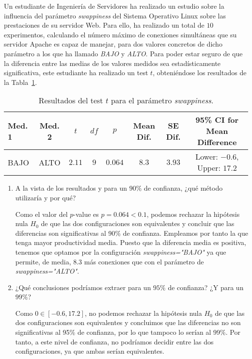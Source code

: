 \begin{ejercicio}\label{ej:4.18}
Un estudiante de Ingeniería de Servidores ha realizado un estudio sobre la influencia del parámetro \emph{swappiness} del Sistema Operativo Linux sobre las prestaciones de su servidor Web. Para ello, ha realizado un total de $10$ experimentos, calculando el número máximo de conexiones simultáneas que su servidor Apache es capaz de manejar, para dos valores concretos de dicho parámetro a los que ha llamado \emph{BAJO} y \emph{ALTO}. Para poder estar seguro de que la diferencia entre las medias de los valores medidos sea estadísticamente significativa, este estudiante ha realizado un test $t$, obteniéndose los resultados de la Tabla~\ref{tab:ej:4.18}.
\begin{table}[h]
\centering
\begin{tabular}{@{}lccccccc@{}}
\toprule
Med. 1 & Med. 2 & $t$ & $df$ & $p$ & Mean Dif. & SE Dif. & 95\% CI for Mean Difference \\ \midrule
BAJO & ALTO & $2.11$ & $9$ & $0.064$ & $8.3$ & $3.93$ & Lower: $-0.6$, Upper: $17.2$ \\ \bottomrule
\end{tabular}
\caption{Resultados del test $t$ para el parámetro \emph{swappiness}.}
\label{tab:ej:4.18}
\end{table}
\begin{enumerate}
    \item A la vista de los resultados y para un $90\%$ de confianza, ¿qué método utilizaría y por qué?
    
    Como el valor del $p$-value es $p=0.064<0.1$, podemos rechazar la hipótesis nula $H_0$ de que las dos configuraciones son equivalentes y concluir que las diferencias son significativas al 90\% de confianza. Empleamos por tanto la que tenga mayor productividad media. Puesto que la diferencia media es positiva, tenemos que optamos por la configuración \emph{swappiness="BAJO"} ya que permite, de media, $8.3$ más conexiones que con el parámetro de \emph{swappiness="ALTO"}.
    \item ¿Qué conclusiones podríamos extraer para un $95\%$ de confianza? ¿Y para un $99\%$?
    
    Como $0\in [-0.6, 17.2]$, no podemos rechazar la hipótesis nula $H_0$ de que las dos configuraciones son equivalentes y concluimos que las diferencias no son significativas al 95\% de confianza, por lo que tampoco lo serían al 99\%. Por tanto, a este nivel de confianza, no podríamos decidir entre las dos configuraciones, ya que ambas serían equivalentes.
\end{enumerate}
\end{ejercicio}
\begin{comment}Sol:
a) Hay diferencias significativas ($p$-value $< 0.1$). Debo usar \emph{swappiness="BAJO"} ya que permite, de media, $8.3$ más conexiones que con el parámetro de \emph{swappiness="ALTO"}.
b) En ambos casos las diferencias no son significativas ($p$-value $> 0.05$ y $p$-value $> 0.01$).
\end{comment}

